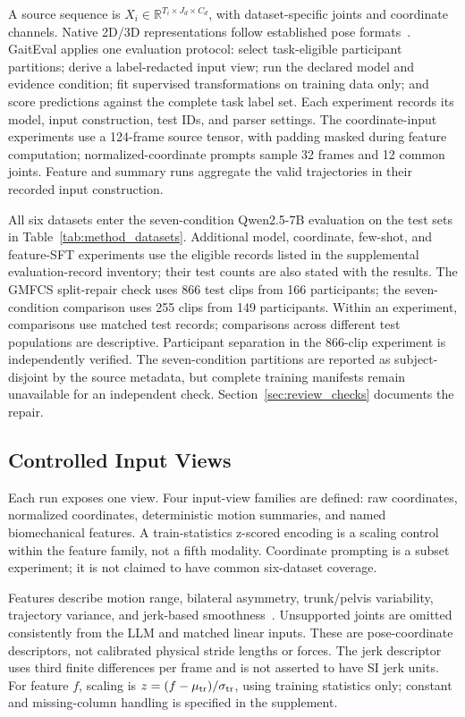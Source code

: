 A source sequence is $X_i\in\mathbb{R}^{T_i\times J_d\times C_d}$, with dataset-specific joints and coordinate channels. Native 2D/3D representations follow established pose formats~\cite{cao2017openpose,ionescu2014human36m}. GaitEval applies one evaluation protocol: select task-eligible participant partitions; derive a label-redacted input view; run the declared model and evidence condition; fit supervised transformations on training data only; and score predictions against the complete task label set. Each experiment records its model, input construction, test IDs, and parser settings. The coordinate-input experiments use a 124-frame source tensor, with padding masked during feature computation; normalized-coordinate prompts sample 32 frames and 12 common joints. Feature and summary runs aggregate the valid trajectories in their recorded input construction.

All six datasets enter the seven-condition Qwen2.5-7B evaluation on the test sets in Table~\ref{tab:method_datasets}. Additional model, coordinate, few-shot, and feature-SFT experiments use the eligible records listed in the supplemental evaluation-record inventory; their test counts are also stated with the results. The GMFCS split-repair check uses 866 test clips from 166 participants; the seven-condition comparison uses 255 clips from 149 participants. Within an experiment, comparisons use matched test records; comparisons across different test populations are descriptive. Participant separation in the 866-clip experiment is independently verified. The seven-condition partitions are reported as subject-disjoint by the source metadata, but complete training manifests remain unavailable for an independent check. Section~\ref{sec:review_checks} documents the repair.

\subsection{Controlled Input Views}
\label{sec:input_views}
Each run exposes one view. Four input-view families are defined: raw coordinates, normalized coordinates, deterministic motion summaries, and named biomechanical features. A train-statistics z-scored encoding is a scaling control within the feature family, not a fifth modality. Coordinate prompting is a subset experiment; it is not claimed to have common six-dataset coverage.

Features describe motion range, bilateral asymmetry, trunk/pelvis variability, trajectory variance, and jerk-based smoothness~\cite{winter2009biomechanics,schwartz2008gdi}. Unsupported joints are omitted consistently from the LLM and matched linear inputs. These are pose-coordinate descriptors, not calibrated physical stride lengths or forces. The jerk descriptor uses third finite differences per frame and is not asserted to have SI jerk units. For feature $f$, scaling is $z=(f-\mu_{\rm tr})/\sigma_{\rm tr}$, using training statistics only; constant and missing-column handling is specified in the supplement.

